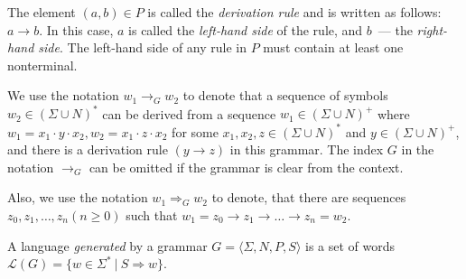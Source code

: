 The element $(a, b) \in P$ is called the \textit{derivation rule} and is written as follows: $a \rightarrow b$. In this case, $a$ is called the \textit{left-hand side} of the rule, and $b$~--- the \textit{right-hand side}. The left-hand side of any rule in $P$ must contain at least one nonterminal.

%	
\begin{definition}    
We use the notation $w_1 \rightarrow_G w_2$ to denote that a sequence of symbols $w_2 \in  ( \Sigma \cup  N )^*$ can be derived from a sequence $w_1 \in  ( \Sigma \cup  N )^+$ where $w_1 = x_1 \cdot y \cdot x_2, w_2 = x_1 \cdot z \cdot x_2$ for some $x_1, x_2, z \in   (\Sigma \cup N )^*$ and $y \in  (\Sigma \cup N )^+$, and there is a derivation rule $(y \rightarrow z)$ in this grammar. The index $G$ in the notation $\rightarrow_G$ can be omitted if the grammar is clear from the context.

Also, we use the notation $w_1 \Rightarrow_G w_2$ to denote, that there are sequences $z_0, z_1, \ldots, z_n  (n \geq 0)$ such that $w_1 = z_0 \rightarrow z_1 \rightarrow \ldots \rightarrow z_n = w_2$.
\end{definition}

\begin{definition}  
	A language \textit{generated} by a grammar $G = \langle \Sigma, N, P, S \rangle$ is a set of words $\mathcal{L}(G)  = \{ w \in \Sigma^*~|~S \Rightarrow w \}$.
\end{definition}

